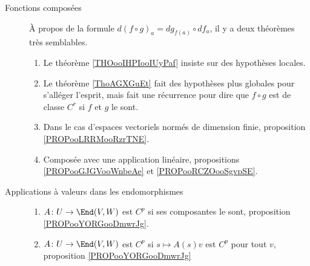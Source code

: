\begin{description}
\begin{enumerate}
		\end{enumerate}
	\item[Fonctions composées]
		À propos de la formule \( d(f\circ g)_a=dg_{f(a)}\circ df_a\), il y a deux théorèmes très semblables.
		\begin{enumerate}
			\item
			      Le théorème \ref{THOooIHPIooIUyPaf} insiste sur des hypothèses locales.
			\item
			      Le théorème \ref{ThoAGXGuEt} fait des hypothèses plus globales pour s'alléger l'esprit, mais fait une récurrence pour dire que \( f\circ g\) est de classe \( C^r\) si \( f\) et \( g\) le sont.
			\item
			      Dans le cas d'espaces vectoriels normés de dimension finie, proposition \ref{PROPooLRRMooRzrTNE}.
			\item
			      Composée avec une application linéaire, propositions \ref{PROPooGJGVooWnbeAe} et \ref{PROPooRCZOooSgvpSE}.
		\end{enumerate}
	\item[Applications à valeurs dans les endomorphismes]
		\begin{enumerate}
			\item
			      \(A \colon U\to \End(V,W)  \) est \( C^p\) si ses composantes le sont, proposition \ref{PROPooYORGooDmwrJg}.
			\item
			      \(A \colon U\to \End(V,W)  \) est \( C^p\) si \( s\mapsto A(s)v\) est \( C^p\) pour tout \( v\), proposition \ref{PROPooYORGooDmwrJg}
		\end{enumerate}
\end{description}
